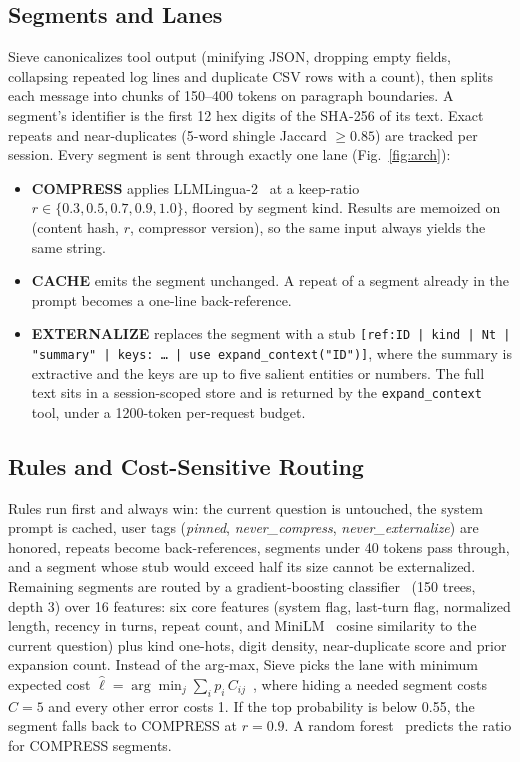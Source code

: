 \documentclass[journal]{IEEEtran}
\begin{document}
\subsection{Segments and Lanes}
Sieve canonicalizes tool output (minifying JSON, dropping empty fields, collapsing repeated log lines and duplicate CSV rows with a count),
then splits each message into chunks of 150--400 tokens on paragraph boundaries. A
segment's identifier is the first 12 hex digits of the SHA-256 of its text. Exact repeats and near-duplicates (5-word shingle Jaccard
$\ge0.85$) are tracked per session. Every segment is sent through exactly one lane (Fig.~\ref{fig:arch}):
\begin{itemize}
\item \textbf{COMPRESS} applies LLMLingua-2~\cite{pan2024llmlingua2} at a keep-ratio $r\in\{0.3,0.5,0.7,0.9,1.0\}$, floored by segment kind.
Results are memoized on (content hash, $r$, compressor version), so the same input always yields the same string.
\item \textbf{CACHE} emits the segment unchanged. A repeat of a segment already in the prompt becomes a one-line back-reference.
\item \textbf{EXTERNALIZE} replaces the segment with a stub
\texttt{[ref:ID | kind | Nt | "summary" | keys: \ldots\ | use expand\_context("ID")]}, where the summary is extractive and the keys are up to
five salient entities or numbers. The full text sits in a session-scoped store and is returned by the \texttt{expand\_context} tool, under a
1200-token per-request budget.
\end{itemize}

\subsection{Rules and Cost-Sensitive Routing}
Rules run first and always win: the current question is untouched, the system prompt is cached, user tags (\textit{pinned},
\textit{never\_compress}, \textit{never\_externalize}) are honored, repeats become back-references, segments under
40 tokens pass through, and a segment whose stub would exceed half its size cannot be externalized.
Remaining segments are routed by a gradient-boosting classifier~\cite{friedman2001gbm} (150 trees, depth 3) over 16 features: six core
features (system flag, last-turn flag, normalized length, recency in turns, repeat count, and MiniLM~\cite{wang2020minilm,reimers2019sbert}
cosine similarity to the current question) plus kind one-hots, digit density, near-duplicate score and prior expansion count. Instead of
the arg-max, Sieve picks the lane with minimum expected cost $\hat{\ell}=\arg\min_j\sum_i p_i\,C_{ij}$~\cite{elkan2001cost}, where hiding a
needed segment costs $C=5$ and every other error costs 1. If the top probability is below 0.55, the segment
falls back to COMPRESS at $r=0.9$. A random forest~\cite{breiman2001rf} predicts the ratio for COMPRESS segments.
\end{document}
